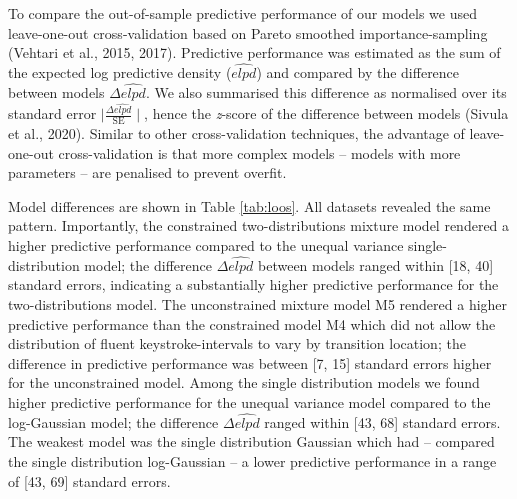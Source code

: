 \documentclass[
  man,floatsintext]{apa7}
\begin{document}
To compare the out-of-sample predictive performance of our models we used leave-one-out cross-validation based on Pareto smoothed importance-sampling (Vehtari et al., 2015, 2017). Predictive performance was estimated as the sum of the expected log predictive density (\(\widehat{elpd}\)) and compared by the difference between models \(\Delta\widehat{elpd}\). We also summarised this difference as normalised over its standard error \(\mid\frac{\Delta\widehat{elpd}}{\text{SE}}\mid\), hence the \emph{z}-score of the difference between models (Sivula et al., 2020). Similar to other cross-validation techniques, the advantage of leave-one-out cross-validation is that more complex models -- models with more parameters -- are penalised to prevent overfit.

Model differences are shown in Table \ref{tab:loos}. All datasets revealed the same pattern. Importantly, the constrained two-distributions mixture model rendered a higher predictive performance compared to the unequal variance single-distribution model; the difference \(\Delta\widehat{elpd}\) between models ranged within {[}18, 40{]} standard errors, indicating a substantially higher predictive performance for the two-distributions model. The unconstrained mixture model M5 rendered a higher predictive performance than the constrained model M4 which did not allow the distribution of fluent keystroke-intervals to vary by transition location; the difference in predictive performance was between {[}7, 15{]} standard errors higher for the unconstrained model. Among the single distribution models we found higher predictive performance for the unequal variance model compared to the log-Gaussian model; the difference \(\Delta\widehat{elpd}\) ranged within {[}43, 68{]} standard errors. The weakest model was the single distribution Gaussian which had -- compared the single distribution log-Gaussian -- a lower predictive performance in a range of {[}43, 69{]} standard errors.
\end{document}
